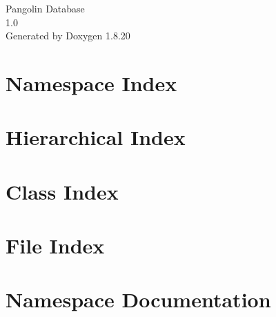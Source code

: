 \let\mypdfximage\pdfximage\def\pdfximage{\immediate\mypdfximage}\documentclass[twoside]{book}
\newcommand{\+}{\discretionary{\mbox{\scriptsize$\hookleftarrow$}}{}{}}
\newcommand{\clearemptydoublepage}{%
  \newpage{\pagestyle{empty}\cleardoublepage}%
}
\begin{document}
\begin{titlepage}
\vspace*{7cm}
\begin{center}%
{\Large Pangolin Database \\[1ex]\large 1.\+0 }\\
\vspace*{1cm}
{\large Generated by Doxygen 1.8.20}\\
\end{center}
\end{titlepage}
\clearemptydoublepage
{}
\tableofcontents
\clearemptydoublepage
{}

\chapter{Namespace Index}

\chapter{Hierarchical Index}

\chapter{Class Index}

\chapter{File Index}

\chapter{Namespace Documentation}












\end{document}
